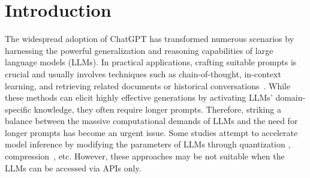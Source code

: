 \section{Introduction}

% 



The widespread adoption of ChatGPT has transformed numerous scenarios by harnessing the powerful generalization and reasoning capabilities of large language models (LLMs).
In practical applications, crafting suitable prompts is crucial and usually involves techniques such as chain-of-thought, in-context learning, and retrieving related documents or historical conversations~\cite{wei2022chain,Chase_LangChain_2022}. 
While these methods can elicit highly effective generations by activating LLMs' domain-specific knowledge, they often require longer prompts. 
Therefore, striking a balance between the massive computational demands of LLMs and the need for longer prompts has become an urgent issue. %
Some studies attempt to accelerate model inference by modifying the parameters of LLMs through quantization \cite{dettmers2022gptint,xiao2022smoothquant}, compression~\cite{frantar2023sparsegpt}, etc.
However, these approaches may be not suitable when the LLMs can be accessed via APIs only.


